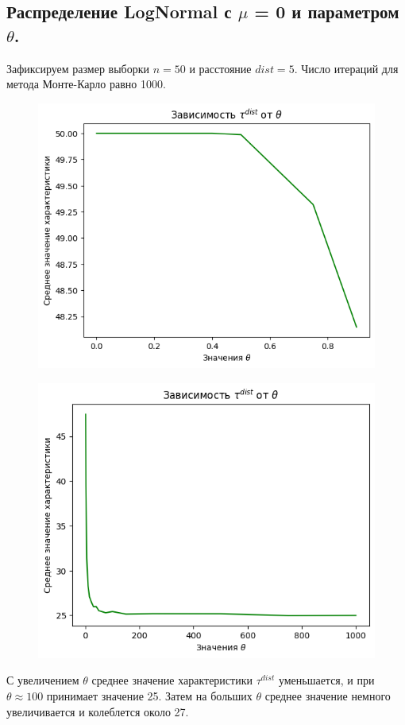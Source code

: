 \documentclass{report}
\begin{document}
\subsection{Распределение LogNormal с $\mu$ = 0 и параметром $\theta$.}
Зафиксируем размер выборки $n = 50$ и расстояние $dist = 5$. Число итераций для метода Монте-Карло равно 1000.
\begin{figure}[h]
    \centering
    \includegraphics[width=0.5\linewidth]{5.png}
\end{figure}
\begin{figure}[h]
    \centering
    \includegraphics[width=0.5\linewidth]{6.png}
\end{figure}
\newline
\newline
С увеличением $\theta$ среднее значение характеристики $\tau^{dist}$ уменьшается, и при $\theta \approx 100$ принимает значение 25. Затем на больших $\theta$ среднее значение немного увеличивается и колеблется около 27.
\end{document}

